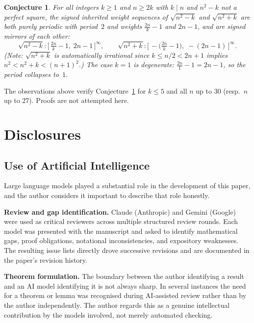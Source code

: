 \documentclass[12pt]{article}
\theoremstyle{definition}
\theoremstyle{remark}
\theoremstyle{plain}
\newtheorem{conjecture}[theorem]{Conjecture}
\begin{document}
\begin{conjecture}
\label{conj:sqrt-n2-pm-k}
For all integers $k \geq 1$ and $n \geq 2k$ with $k \mid n$ and $n^2 - k$ not a
perfect square, the signed inherited weight sequences of $\sqrt{n^2 - k}$ and
$\sqrt{n^2 + k}$ are both purely periodic with period~$2$ and weights
$\tfrac{2n}{k} - 1$ and $2n - 1$, and are signed mirrors of each other:
\[
  \sqrt{n^2 - k} : \bigl[\,\tfrac{2n}{k}-1,\; 2n-1\,\bigr]^\infty, \qquad
  \sqrt{n^2 + k} : \bigl[\,-\bigl(\tfrac{2n}{k}-1\bigr),\; -(2n-1)\,\bigr]^\infty.
\]
(Note: $\sqrt{n^2 + k}$ is automatically irrational since $k \leq n/2 < 2n+1$
implies $n^2 < n^2+k < (n+1)^2$.)
The case $k = 1$ is degenerate: $\tfrac{2n}{1} - 1 = 2n - 1$, so the period collapses
to~$1$.
\end{conjecture}

The observations above verify Conjecture~\ref{conj:sqrt-n2-pm-k} for $k \leq 5$ and
all $n$ up to $30$ (resp.\ $n$ up to $27$).  Proofs are not attempted here.

\section*{Disclosures}
\label{sec:disclosures}

\subsection*{Use of Artificial Intelligence}

Large language models played a substantial role in the development of this paper,
and the author considers it important to describe that role honestly.

\textbf{Review and gap identification.}
Claude (Anthropic) and Gemini (Google) were used as critical reviewers across
multiple structured review rounds.
Each model was presented with the manuscript and asked to identify mathematical
gaps, proof obligations, notational inconsistencies, and expository weaknesses.
The resulting issue lists directly drove successive revisions and are documented
in the paper's revision history.

\textbf{Theorem formulation.}
The boundary between the author identifying a result and an AI model identifying
it is not always sharp.
In several instances the need for a theorem or lemma was recognised during
AI-assisted review rather than by the author independently.
The author regards this as a genuine intellectual contribution by the models
involved, not merely automated checking.
\end{document}
